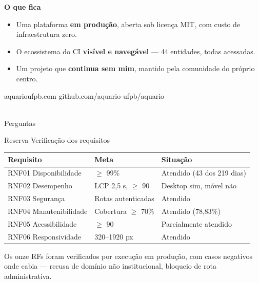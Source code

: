 \documentclass[aspectratio=169,11pt]{beamer}
\newcommand{\destaque}[1]{{\color{azul}\textbf{#1}}}
\newcommand{\nota}[1]{{\footnotesize\color{cinza}#1}}
\begin{document}
\begin{frame}[plain]
  \vspace{1.6em}
  \centering
  {\Large\bfseries\color{azul}O que fica}\\[1.6em]

  \begin{minipage}{0.82\textwidth}
  \begin{itemize}\setlength\itemsep{0.7em}
    \item Uma plataforma \destaque{em produção}, aberta sob licença MIT,
      com custo de infraestrutura zero.
    \item O ecossistema do CI \destaque{visível e navegável} ---
      44 entidades, todas acessadas.
    \item Um projeto que \destaque{continua sem mim}, mantido pela comunidade
      do próprio centro.
  \end{itemize}
  \end{minipage}
  \vspace{2em}

  \nota{aquarioufpb.com \quad \textperiodcentered{} \quad github.com/aquario-ufpb/aquario}
\end{frame}

\begin{frame}[plain]
  \vspace{3.2em}
  \\[1.2em]
  \nota{Perguntas}
\end{frame}

\appendix

\begin{frame}{Reserva \textperiodcentered{} Verificação dos requisitos}
  \vspace{0.4em}
  \small
  \begin{tabular}{lll}
    \toprule
    \textbf{Requisito} & \textbf{Meta} & \textbf{Situação} \\
    \midrule
    RNF01 Disponibilidade   & $\geq$ 99\%           & Atendido (43 dos 219 dias) \\
    RNF02 Desempenho        & LCP 2,5 s, $\geq$ 90  & Desktop sim, móvel não \\
    RNF03 Segurança         & Rotas autenticadas    & Atendido \\
    RNF04 Manutenibilidade  & Cobertura $\geq$ 70\% & Atendido (78,83\%) \\
    RNF05 Acessibilidade    & $\geq$ 90             & Parcialmente atendido \\
    RNF06 Responsividade    & 320--1920 px          & Atendido \\
    \bottomrule
  \end{tabular}
  \vspace{1em}

  \nota{Os onze RFs foram verificados por execução em produção, com casos negativos
  onde cabia --- recusa de domínio não institucional, bloqueio de rota administrativa.}
\end{frame}
\end{document}
